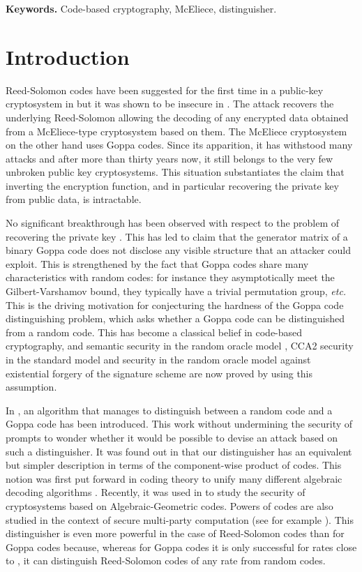 \documentclass[runningheads,11pt]{llncs}
\begin{document}
\textbf{Keywords.} Code-based cryptography, McEliece, distinguisher.


\section{Introduction}
 



Reed-Solomon codes have been suggested for the first time in a public-key
cryptosystem in \cite{Niederreiter86} but it was shown to be insecure in 
\cite{SidelShesta92}. The attack recovers the underlying Reed-Solomon
allowing the decoding of any encrypted data obtained from a McEliece-type 
cryptosystem based on them. The McEliece cryptosystem
\cite{McEliece78} on the other hand uses Goppa codes.
Since its apparition, it has withstood many attacks and after more than thirty years now, it still belongs 
to the very few unbroken public key cryptosystems. This situation substantiates the claim that inverting 
the encryption function, and in particular recovering the private key from public data, is intractable. 

No significant  breakthrough has been observed with respect to the problem of 
recovering the private key \cite{Gib91,LS01}. This has led to claim that the generator matrix of a binary Goppa 
code does not disclose any visible structure that an attacker could exploit. This is strengthened by the fact that Goppa codes
share many characteristics with random codes: for instance they asymptotically meet the Gilbert-Varshamov bound, they typically have 
a trivial permutation group, \textit{etc.}  
This is the driving motivation for conjecturing the hardness of the Goppa code distinguishing problem, which asks whether a Goppa code can be 
distinguished from a random code. This has become 
a classical belief in code-based cryptography, and semantic security
in the random oracle model \cite{NojimaIKM08}, CCA2 security in the standard model \cite{DowsleyMN09} and security in the random oracle model 
against existential forgery \cite{Dallot07} of the signature scheme \cite{CouFinSen01} are now proved by using this assumption.

\medskip

In \cite{FGOPT11a}, an algorithm  that manages to 
distinguish between a random code and a Goppa code has been introduced.
This work without undermining the security of \cite{McEliece78}
prompts to wonder whether it would be possible to devise an attack based 
on such a distinguisher. 
It was found out in \cite{MP12a} that our distinguisher \cite{FGOPT11a} has an equivalent but simpler description
in terms of the component-wise product of codes. This notion was first put forward in coding theory to unify many 
different algebraic decoding algorithms \cite{Pel92,Kot92a}. Recently, it was used in \cite{CMP11}
to study the security of cryptosystems based on Algebraic-Geometric codes.
Powers of codes are also studied in the context of secure multi-party computation (see for example \cite{Cramer09,Cramer11}).
This distinguisher is even more powerful in the case of Reed-Solomon codes 
than for Goppa codes because,
whereas for Goppa codes it is only successful for rates close to , it can distinguish 
Reed-Solomon codes of any rate from random codes. 
\end{document}
